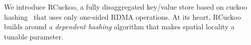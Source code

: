 We introduce RCuckoo, a fully disaggregated key/value store based on
cuckoo hashing~\cite{cuckoo} that
uses only one-sided RDMA operations.  At its heart, RCuckoo builds
around a \emph{dependent hashing} algorithm that makes spatial
locality a tunable parameter.
%
%
%
%
%
